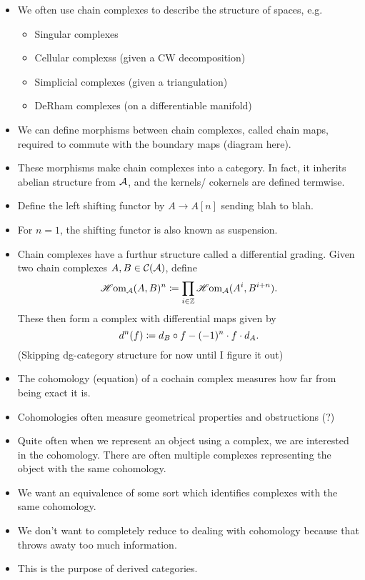 \documentclass[a4paper]{article}
\begin{document}
\begin{itemize}
    \item We often use chain complexes to describe the structure of spaces, e.g.
        \begin{itemize}
            \item Singular complexes
            \item Cellular complexss (given a CW decomposition)
            \item Simplicial complexes (given a triangulation)
            \item DeRham complexes (on a differentiable manifold)
        \end{itemize}
    \item We can define morphisms between chain complexes, called chain maps, required to commute with the boundary maps (diagram here).
    \item These morphisms make chain complexes into a category. In fact, it inherits abelian structure from $\mathcal{A}$, and the kernels/ cokernels are defined termwise.
    \item Define the left shifting functor by $A \to A[n]$ sending blah to blah.
    \item For $n=1$, the shifting functor is also known as suspension.
    \item Chain complexes have a furthur structure called a differential grading. Given two chain complexes $A, B \in \mathcal{C}(\mathcal{A})$, define
        \[
            \operatorname{\mathscr{H}om}_{\mathcal{A}}(A, B)^n \coloneqq \prod_{i \in \mathbb{Z}} \operatorname{\mathscr{H}om}_{\mathcal{A}}(A^i, B^{i+n}).
        \]
        These then form a complex with differential maps given by
        \[
            d^n(f) \coloneqq d_B \circ f - (-1)^n \cdot f \cdot d_A.
        \]
        (Skipping dg-category structure for now until I figure it out)
    \item The cohomology (equation) of a cochain complex measures how far from being exact it is. 
    \item Cohomologies often measure geometrical properties and obstructions (?)
    \item Quite often when we represent an object using a complex, we are interested in the cohomology. There are often multiple complexes representing the object with the same cohomology.
    \item We want an equivalence of some sort which identifies complexes with the same cohomology.
    \item We don't want to completely reduce to dealing with cohomology because that throws awaty too much information.
    \item This is the purpose of derived categories.

\end{itemize}
\end{document}
